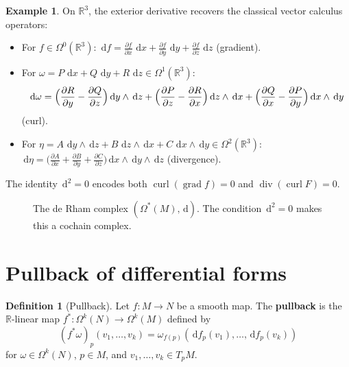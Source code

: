 \documentclass[12pt,a4paper,openany]{book}
\theoremstyle{definition}
\newtheorem{definition}[theorem]{Definition}
\newtheorem{example}[theorem]{Example}
\theoremstyle{remark}
\newcommand{\R}{\mathbb{R}}
\newcommand{\dd}{\,\mathrm{d}}
\begin{document}
\begin{example}\label{ex:exterior-derivative-R3}
On $\R^3$, the exterior derivative recovers the classical vector calculus
operators:
\begin{itemize}
  \item For $f \in \Omega^0(\R^3)$: $\dd f = \frac{\partial f}{\partial x}\,
    \dd x + \frac{\partial f}{\partial y}\,\dd y
    + \frac{\partial f}{\partial z}\,\dd z$ (gradient).
  \item For $\omega = P\,\dd x + Q\,\dd y + R\,\dd z \in \Omega^1(\R^3)$:
    \[
      \dd\omega = \Bigl(\frac{\partial R}{\partial y}
        - \frac{\partial Q}{\partial z}\Bigr)\dd y \wedge \dd z
      + \Bigl(\frac{\partial P}{\partial z}
        - \frac{\partial R}{\partial x}\Bigr)\dd z \wedge \dd x
      + \Bigl(\frac{\partial Q}{\partial x}
        - \frac{\partial P}{\partial y}\Bigr)\dd x \wedge \dd y
    \]
    (curl).
  \item For $\eta = A\,\dd y \wedge \dd z + B\,\dd z \wedge \dd x
    + C\,\dd x \wedge \dd y \in \Omega^2(\R^3)$:
    $\dd\eta = \bigl(\frac{\partial A}{\partial x}
      + \frac{\partial B}{\partial y}
      + \frac{\partial C}{\partial z}\bigr)\dd x \wedge \dd y \wedge \dd z$
    (divergence).
\end{itemize}
The identity $\dd^2 = 0$ encodes both $\operatorname{curl}(\operatorname{grad} f) = 0$
and $\operatorname{div}(\operatorname{curl} F) = 0$.
\end{example}

\begin{figure}[ht]
\centering
{}
\caption{The de Rham complex $(\Omega^*(M), \dd)$.
  The condition $\dd^2 = 0$ makes this a cochain complex.}
\label{fig:derham-complex}
\end{figure}

\section{Pullback of differential forms}\label{sec:pullback-forms}

\begin{definition}[Pullback]\label{def:pullback-form}
Let $f \colon M \to N$ be a smooth map. The \textbf{pullback} is the
$\R$-linear map $f^* \colon \Omega^k(N) \to \Omega^k(M)$ defined by
\[
  (f^*\omega)_p(v_1, \ldots, v_k)
    = \omega_{f(p)}(\dd f_p(v_1), \ldots, \dd f_p(v_k))
\]
for $\omega \in \Omega^k(N)$, $p \in M$, and $v_1, \ldots, v_k \in T_p M$.
\end{definition}
\end{document}
